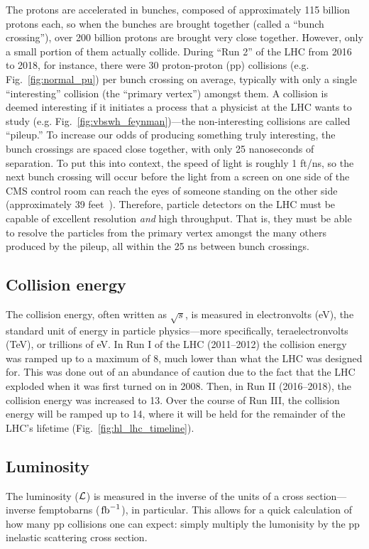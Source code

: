 The protons are accelerated in bunches, composed of approximately 115 billion protons each, so when the bunches are brought together (called a ``bunch crossing''), over 200 billion protons are brought very close together.
However, only a small portion of them actually collide. 
During ``Run 2'' of the LHC from 2016 to 2018, for instance, there were 30 proton-proton (pp) collisions (e.g. Fig.~\ref{fig:normal_pu}) per bunch crossing on average, typically with only a single ``interesting'' collision (the ``primary vertex'') amongst them. %
A collision is deemed interesting if it initiates a process that a physicist at the LHC wants to study (e.g. Fig.~\ref{fig:vbswh_feynman})---the non-interesting collisions are called ``pileup.'' 
To increase our odds of producing something truly interesting, the bunch crossings are spaced close together, with only 25 nanoseconds of separation. 
To put this into context, the speed of light is roughly 1 ft/ns, so the next bunch crossing will occur before the light from a screen on one side of the CMS control room can reach the eyes of someone standing on the other side (approximately 39 feet~\cite{CMSP5Layout}).
Therefore, particle detectors on the LHC must be capable of excellent resolution \textit{and} high throughput. 
That is, they must be able to resolve the particles from the primary vertex amongst the many others produced by the pileup, all within the 25 ns between bunch crossings. 

\subsection{Collision energy}
The collision energy, often written as $\sqrt{s}$, is measured in electronvolts (eV), the standard unit of energy in particle physics---more specifically, teraelectronvolts (TeV), or trillions of eV. 
In Run I of the LHC (2011--2012) the collision energy was ramped up to a maximum of 8\TeV, much lower than what the LHC was designed for. %
This was done out of an abundance of caution due to the fact that the LHC exploded when it was first turned on in 2008. %
Then, in Run II (2016--2018), the collision energy was increased to 13\TeV. 
Over the course of Run III, the collision energy will be ramped up to 14\TeV, where it will be held for the remainder of the LHC's lifetime (Fig.~\ref{fig:hl_lhc_timeline}). 

\subsection{Luminosity}
The luminosity ($\mathcal{L}$) is measured in the inverse of the units of a cross section---inverse femptobarns ($\mbox{\ensuremath{\,\text{fb}^{-1}}}$), in particular. 
This allows for a quick calculation of how many pp collisions one can expect: simply multiply the lumonisity by the pp inelastic scattering cross section. 

